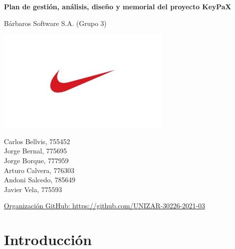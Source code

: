\documentclass{article}
\begin{document}
\begin{titlepage}
    \centering
    \vspace*{\fill}

    \vspace*{0.5cm}

    \Huge
    \textbf{Plan de gestión, análisis, diseño y memorial del proyecto KeyPaX}

    \vspace*{0.5cm}

    \huge
    Bárbaros Software S.A. (Grupo 3)

    \includegraphics[height=5cm]{../images/logo.jpg}

    \begin{Large}
        Carlos Bellvis, 755452\\
        Jorge Bernal, 775695\\
        Jorge Borque, 777959\\
        Arturo Calvera, 776303\\
        Andoni Salcedo, 785649\\
        Javier Vela, 775593\\
    \end{Large}

    \vspace*{1cm}

    \large
    \href{https://github.com/UNIZAR-30226-2021-03}{Organización GitHub: https://github.com/UNIZAR-30226-2021-03}

    \vspace*{\fill}

\end{titlepage}

\pagebreak

\tableofcontents

\pagebreak

\section{Introducción}
\end{document}
